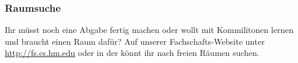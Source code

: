 \subsubsection{Raumsuche}
Ihr müsst noch eine Abgabe fertig machen oder wollt mit Kommilitonen 
lernen und braucht einen Raum dafür? Auf unserer Fachschafts-Website unter \url{http://fs.cs.hm.edu} \arrow {} \arrow {} oder in der
 könnt ihr nach freien Räumen suchen.